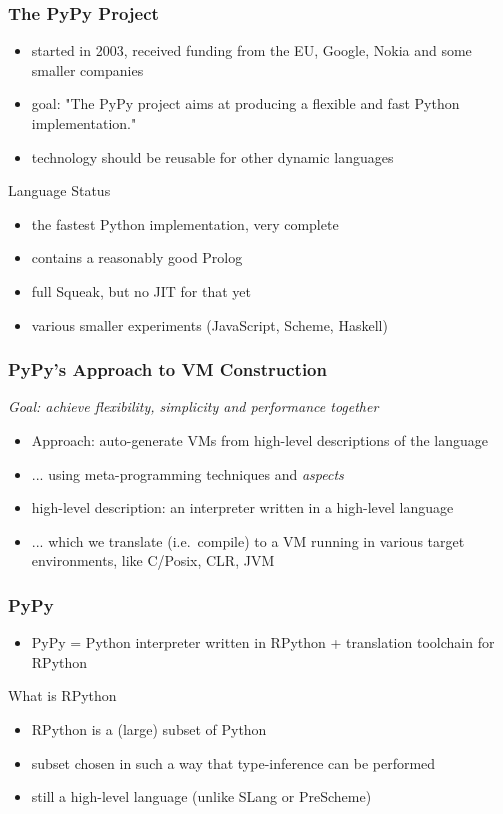\documentclass[utf8x]{beamer}
\begin{document}
\begin{frame}
  \frametitle{The PyPy Project}
  \begin{itemize}
      \item started in 2003, received funding from the EU, Google, Nokia and some smaller companies
      \item goal: "The PyPy project aims at producing a flexible and fast Python implementation."
      \item technology should be reusable for other dynamic languages
  \end{itemize}
  \pause
  \begin{block}{Language Status}
    \begin{itemize}
        \item the fastest Python implementation, very complete
        \item contains a reasonably good Prolog
        \item full Squeak, but no JIT for that yet
        \item various smaller experiments (JavaScript, Scheme, Haskell)
    \end{itemize}
      
  \end{block}
\end{frame}

\begin{frame}
  \frametitle{PyPy's Approach to VM Construction}
  \emph{Goal: achieve flexibility, simplicity and performance together}

  \begin{itemize}
  \item Approach: auto-generate VMs from high-level descriptions of the language
  \item ... using meta-programming techniques and \emph{aspects}
  \item high-level description: an interpreter written in a high-level language
  \item ... which we translate (i.e.\ compile) to a VM running in various target
    environments, like C/Posix\pause, CLR, JVM
  \end{itemize}
\end{frame}

\begin{frame}
  \frametitle{PyPy}
  \begin{itemize}
  \item PyPy = Python interpreter written in RPython + translation toolchain
    for RPython
  \end{itemize}
  \pause
  \begin{block}{What is RPython}
    \begin{itemize}
    \item RPython is a (large) subset of Python
    \item subset chosen in such a way that type-inference can be performed
    \item still a high-level language (unlike SLang or PreScheme)
    \end{itemize}
  \end{block}
\end{frame}
\end{document}
